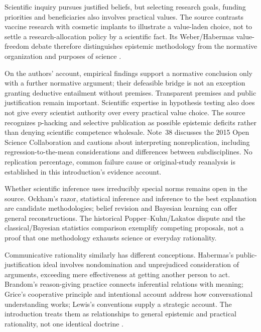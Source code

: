 Scientific inquiry pursues justified beliefs, but selecting research
goals, funding priorities and beneficiaries also involves practical
values. The source contrasts vaccine research with cosmetic implants
to illustrate a value-laden choice, not to settle a research-allocation
policy by a scientific fact. Its Weber/Habermas value-freedom debate
therefore distinguishes epistemic methodology from the normative
organization and purposes of science
\cite[pp.~44--45 and note~38]{KnauffSpohn2021FrameworksIntro}.

On the authors' account, empirical findings support a normative
conclusion only with a further normative argument; their defeasible
bridge is not an exception granting deductive entailment without
premises. Transparent premises and public justification remain
important. Scientific expertise in hypothesis testing also does not
give every scientist authority over every practical value choice.
The source recognizes p-hacking and selective publication as possible
epistemic deficits rather than denying scientific competence wholesale.
Note~38 discusses the 2015 Open Science Collaboration and cautions
about interpreting nonreplication, including regression-to-the-mean
considerations and differences between subdisciplines. No replication
percentage, common failure cause or original-study reanalysis is
established in this introduction's evidence account.

Whether scientific inference uses irreducibly special norms remains
open in the source. Ockham's razor, statistical inference and inference
to the best explanation are candidate methodologies; belief revision
and Bayesian learning can offer general reconstructions. The historical
Popper--Kuhn/Lakatos dispute and the classical/Bayesian statistics
comparison exemplify competing proposals, not a proof that one
methodology exhausts science or everyday rationality.

Communicative rationality similarly has different conceptions.
Habermas's public-justification ideal involves nondomination and
unprejudiced consideration of arguments, exceeding mere effectiveness
at getting another person to act. Brandom's reason-giving practice
connects inferential relations with meaning; Grice's cooperative
principle and intentional account address how conversational
understanding works; Lewis's conventions supply a strategic account.
The introduction treats them as relationships to general epistemic
and practical rationality, not one identical doctrine
\cite[pp.~45--46]{KnauffSpohn2021FrameworksIntro}.

